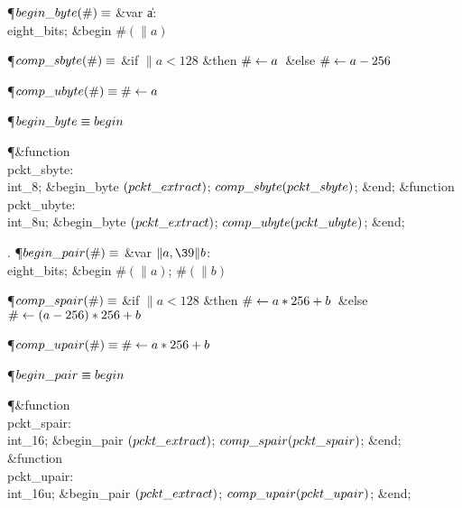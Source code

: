 \Y\P\D {}$\\{begin\_byte}(\#)\S$\1\6
\4\&{var} \|a: \\{eight\_bits};\2\6
\&{begin} $\#(\|a)$\par
\P\D {}$\\{comp\_sbyte}(\#)\S$\1\6
\&{if} $\|a<128$ \1\&{then}\5
$\#\K\|a$\ \&{else} $\#\K\|a-256$\2\2\par
\P\D {}$\\{comp\_ubyte}(\#)\S\#\K\|a$\par
\P\F {}$\\{begin\_byte}\S\\{begin}$\par
\Y\P\4\&{function}\1\  \\{pckt\_sbyte}: \\{int\_8};\2\6
\&{begin\_byte} $(\\{pckt\_extract})$;\5
$\\{comp\_sbyte}(\\{pckt\_sbyte})$;\6
\&{end};\7
\4\&{function}\1\  \\{pckt\_ubyte}: \\{int\_8u};\2\6
\&{begin\_byte} $(\\{pckt\_extract})$;\5
$\\{comp\_ubyte}(\\{pckt\_ubyte})$;\6
\&{end};\par
\fi

. \P\D {}$\\{begin\_pair}(\#)\S$\1\6
\4\&{var} $\|a,\39\|b$: \\{eight\_bits};\2\6
\&{begin} $\#(\|a)$;\5
$\#(\|b)$\par
\P\D {}$\\{comp\_spair}(\#)\S$\1\6
\&{if} $\|a<128$ \1\&{then}\5
$\#\K\|a\ast256+\|b$\ \&{else} $\#\K(\|a-256)\ast256+\|b$\2\2\par
\P\D {}$\\{comp\_upair}(\#)\S\#\K\|a\ast256+\|b$\par
\P\F {}$\\{begin\_pair}\S\\{begin}$\par
\Y\P\4\&{function}\1\  \\{pckt\_spair}: \\{int\_16};\2\6
\&{begin\_pair} $(\\{pckt\_extract})$;\5
$\\{comp\_spair}(\\{pckt\_spair})$;\6
\&{end};\7
\4\&{function}\1\  \\{pckt\_upair}: \\{int\_16u};\2\6
\&{begin\_pair} $(\\{pckt\_extract})$;\5
$\\{comp\_upair}(\\{pckt\_upair})$;\6
\&{end};\par
\fi

